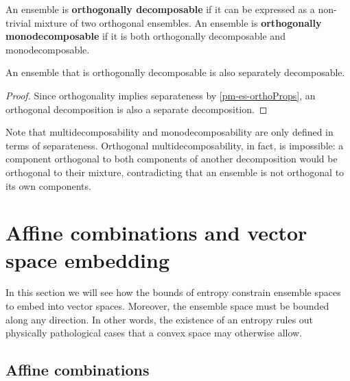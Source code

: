 \begin{mathSection}
\begin{defn}
	An ensemble is \textbf{orthogonally decomposable} if it can be expressed as a non-trivial mixture of two orthogonal ensembles. An ensemble is \textbf{orthogonally monodecomposable} if it is both orthogonally decomposable and monodecomposable.
\end{defn}

\begin{coro}
	An ensemble that is orthogonally decomposable is also separately decomposable.
\end{coro}

\begin{proof}
	Since orthogonality implies separateness by \ref{pm-es-orthoProps}, an orthogonal decomposition is also a separate decomposition.
\end{proof}

\begin{remark}
	 Note that multidecomposability and monodecomposability are only defined in terms of separateness. Orthogonal multidecomposability, in fact, is impossible: a component orthogonal to both components of another decomposition would be orthogonal to their mixture, contradicting that an ensemble is not orthogonal to its own components.
\end{remark}
\end{mathSection}

\section{Affine combinations and vector space embedding}

In this section we will see how the bounds of entropy constrain ensemble spaces to embed into vector spaces. Moreover, the ensemble space must be bounded along any direction. In other words, the existence of an entropy rules out physically pathological cases that a convex space may otherwise allow.


\subsection{Affine combinations}

